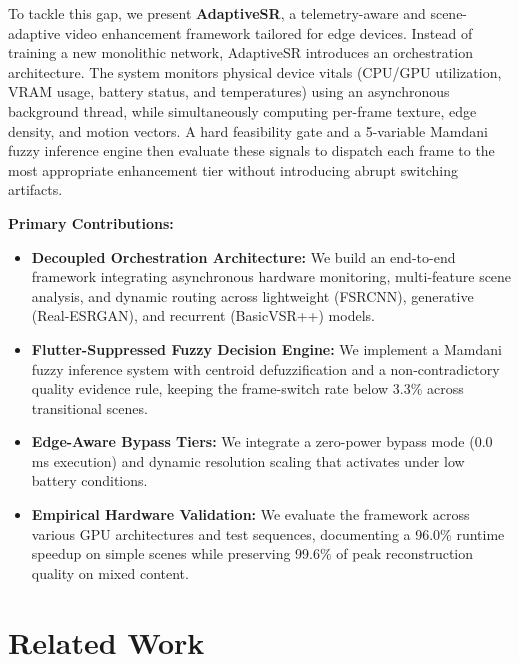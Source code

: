\documentclass[conference]{IEEEtran}
\begin{document}
To tackle this gap, we present \textbf{AdaptiveSR}, a telemetry-aware and scene-adaptive video enhancement framework tailored for edge devices. Instead of training a new monolithic network, AdaptiveSR introduces an orchestration architecture. The system monitors physical device vitals (CPU/GPU utilization, VRAM usage, battery status, and temperatures) using an asynchronous background thread, while simultaneously computing per-frame texture, edge density, and motion vectors. A hard feasibility gate and a 5-variable Mamdani fuzzy inference engine then evaluate these signals to dispatch each frame to the most appropriate enhancement tier without introducing abrupt switching artifacts.

\textbf{Primary Contributions:}
\begin{itemize}
    \item \textbf{Decoupled Orchestration Architecture:} We build an end-to-end framework integrating asynchronous hardware monitoring, multi-feature scene analysis, and dynamic routing across lightweight (FSRCNN), generative (Real-ESRGAN), and recurrent (BasicVSR++) models.
    \item \textbf{Flutter-Suppressed Fuzzy Decision Engine:} We implement a Mamdani fuzzy inference system with centroid defuzzification and a non-contradictory quality evidence rule, keeping the frame-switch rate below 3.3\% across transitional scenes.
    \item \textbf{Edge-Aware Bypass Tiers:} We integrate a zero-power bypass mode ($0.0$\,ms execution) and dynamic resolution scaling that activates under low battery conditions.
    \item \textbf{Empirical Hardware Validation:} We evaluate the framework across various GPU architectures and test sequences, documenting a 96.0\% runtime speedup on simple scenes while preserving 99.6\% of peak reconstruction quality on mixed content.
\end{itemize}

\section{Related Work}
\end{document}
